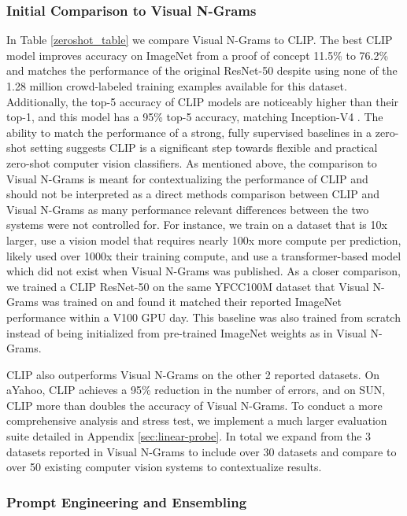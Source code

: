 \subsubsection{Initial Comparison to Visual N-Grams}

In Table \ref{zeroshot_table} we compare Visual N-Grams to CLIP. The best CLIP model improves accuracy on ImageNet from a proof of concept 11.5\% to 76.2\% and matches the performance of the original ResNet-50 despite using none of the 1.28 million crowd-labeled training examples available for this dataset. Additionally, the top-5 accuracy of CLIP models are noticeably higher than their top-1, and this model has a 95\% top-5 accuracy, matching Inception-V4 \cite{szegedy2016inception}. The ability to match the performance of a strong, fully supervised baselines in a zero-shot setting suggests CLIP is a significant step towards flexible and practical zero-shot computer vision classifiers. As mentioned above, the comparison to Visual N-Grams is meant for contextualizing the performance of CLIP and should not be interpreted as a direct methods comparison between CLIP and Visual N-Grams as many performance relevant differences between the two systems were not controlled for. For instance, we train on a dataset that is 10x larger, use a vision model that requires nearly 100x more compute per prediction, likely used over 1000x their training compute, and use a transformer-based model which did not exist when Visual N-Grams was published. As a closer comparison, we trained a CLIP ResNet-50 on the same YFCC100M dataset that Visual N-Grams was trained on and found it matched their reported ImageNet performance within a V100 GPU day. This baseline was also trained from scratch instead of being initialized from pre-trained ImageNet weights as in Visual N-Grams.

CLIP also outperforms Visual N-Grams on the other 2 reported datasets. On aYahoo, CLIP achieves a 95\% reduction in the number of errors, and on SUN, CLIP more than doubles the accuracy of Visual N-Grams. To conduct a more comprehensive analysis and stress test, we implement a much larger evaluation suite detailed in Appendix \ref{sec:linear-probe}. In total we expand from the 3 datasets reported in Visual N-Grams to include over 30 datasets and compare to over 50 existing computer vision systems to contextualize results.

\subsubsection{Prompt Engineering and Ensembling}

